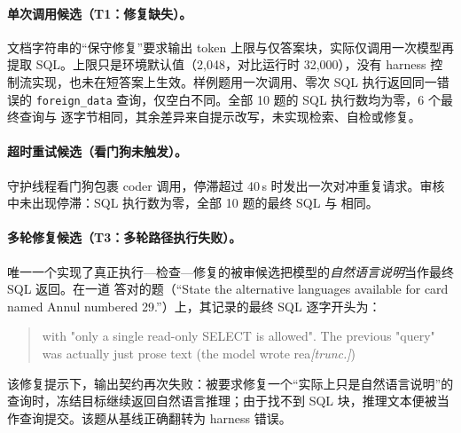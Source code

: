 \paragraph{单次调用候选（T1：修复缺失）。}
文档字符串的“保守修复”要求输出 token 上限与仅答案块，实际仅调用一次模型再提取 SQL。上限只是环境默认值（2{,}048，对比运行时 32{,}000），没有 harness 控制流实现，也未在短答案上生效。样例题用一次调用、零次 SQL 执行返回同一错误的 \texttt{foreign\_data} 查询，仅空白不同。全部 10 题的 SQL 执行数均为零，6 个最终查询与 \bare{} 逐字节相同，其余差异来自提示改写，未实现检索、自检或修复。

\paragraph{超时重试候选（看门狗未触发）。}
守护线程看门狗包裹 coder 调用，停滞超过 40\,s 时发出一次对冲重复请求。审核中未出现停滞：SQL 执行数为零，全部 10 题的最终 SQL 与 \bare{} 相同。

\paragraph{多轮修复候选（T3：多轮路径执行失败）。}唯一一个实现了真正执行—检查—修复的被审候选把模型的\emph{自然语言说明}当作最终 SQL 返回。在一道 \bare{} 答对的题（“State the alternative languages available for card named Annul numbered 29.”）上，其记录的最终 SQL 逐字开头为：
\begin{quote}\small\ttfamily
with "only a single read-only SELECT is allowed". The previous "query" was
actually just prose text (the model wrote rea\emph{[trunc.]})
\end{quote}
该修复提示下，输出契约再次失败：被要求修复一个“实际上只是自然语言说明”的查询时，冻结目标继续返回自然语言推理；由于找不到 SQL 块，推理文本便被当作查询提交。该题从基线正确翻转为 harness 错误。

\FloatBarrier
